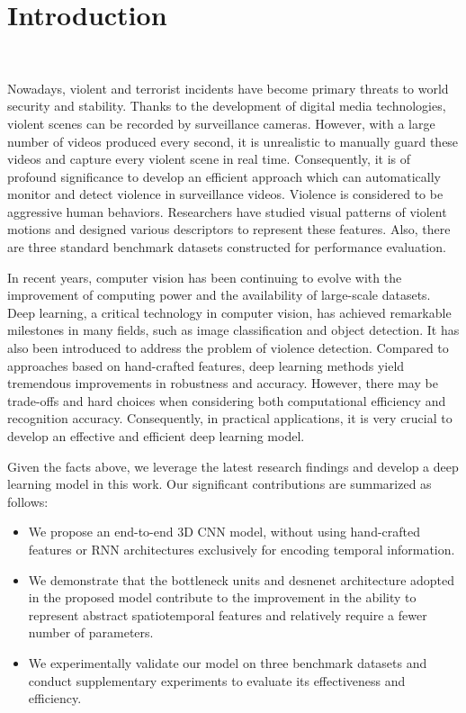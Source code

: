 \documentclass[10pt,twocolumn,letterpaper]{article}
\begin{document}
\section{Introduction}
~\label{sec:1}

Nowadays, violent and terrorist incidents have become primary threats to world security and stability.
Thanks to the development of digital media technologies, violent scenes can be recorded by surveillance cameras.
However, with a large number of videos produced every second, it is unrealistic to manually guard these videos and capture every violent scene in real time.
Consequently, it is of profound significance to develop an efficient approach which can automatically monitor and detect violence in surveillance videos.
Violence is considered to be aggressive human behaviors.
Researchers have studied visual patterns of violent motions and designed various descriptors to represent these features.
Also, there are three standard benchmark datasets constructed for performance evaluation.

In recent years, computer vision has been continuing to evolve with the improvement of computing power and the availability of large-scale datasets.
Deep learning, a critical technology in computer vision, has achieved remarkable milestones in many fields, such as image classification and object detection.
It has also been introduced to address the problem of violence detection.
Compared to approaches based on hand-crafted features, deep learning methods yield tremendous improvements in robustness and accuracy.
However, there may be trade-offs and hard choices when considering both computational efficiency and recognition accuracy.
Consequently, in practical applications, it is very crucial to develop an effective and efficient deep learning model.

Given the facts above, we leverage the latest research findings and develop a deep learning model in this work.
Our significant contributions are summarized as follows:
\begin{itemize}
	\item We propose an end-to-end 3D CNN model, without using hand-crafted features or RNN architectures exclusively for encoding temporal information.
	\item We demonstrate that the bottleneck units and desnenet architecture adopted in the proposed model contribute to the improvement in the ability to represent abstract spatiotemporal features and relatively require a fewer number of parameters.
	\item We experimentally validate our model on three benchmark datasets and conduct supplementary experiments to evaluate its effectiveness and efficiency.
\end{itemize}
\end{document}
